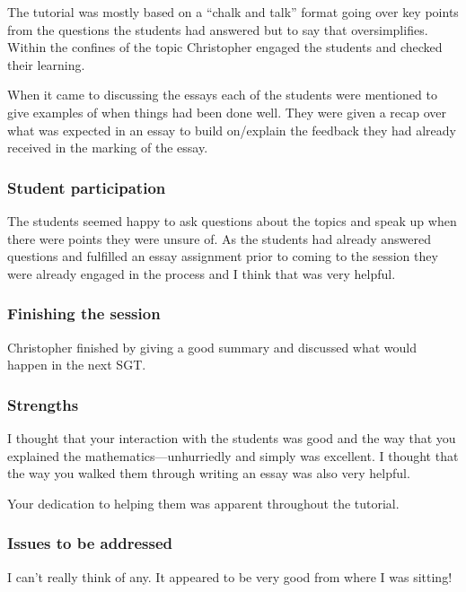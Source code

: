 The tutorial was mostly based on a ``chalk and talk'' format going over key points from the questions the students had answered but to say that oversimplifies. Within the confines of the topic Christopher engaged the students and checked their learning.

When it came to discussing the essays each of the students were mentioned to give examples of when things had been done well. They were given a recap over what was expected in an essay to build on/explain the feedback they had already received in the marking of the essay.

\subsubsection{Student participation}\label{sec:A-participation}

The students seemed happy to ask questions about the topics and speak up when there were points they were unsure of. As the students had already answered questions and fulfilled an essay assignment prior to coming to the session they were already engaged in the process and I think that was very helpful.

\subsubsection{Finishing the session}\label{sec:A-finish}

Christopher finished by giving a good summary and discussed what would happen in the next SGT.

\subsubsection{Strengths}\label{sec:A-strengths}

I thought that your interaction with the students was good and the way that you explained the mathematics---unhurriedly and simply was excellent. I thought that the way you walked them through writing an essay was also very helpful.

Your dedication to helping them was apparent throughout the tutorial.

\subsubsection{Issues to be addressed}

I can't really think of any. It appeared to be very good from where I was sitting! 

